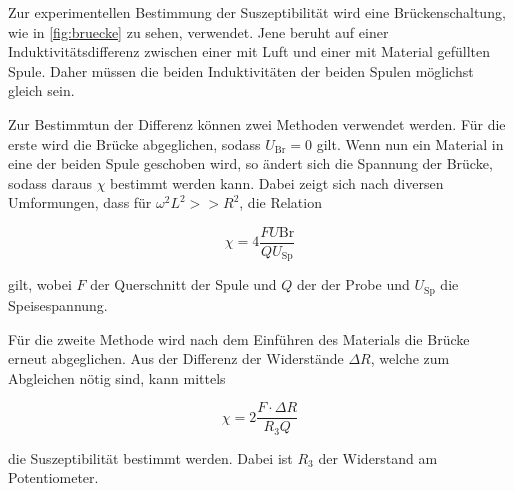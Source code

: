Zur experimentellen Bestimmung der Suszeptibilität wird eine Brückenschaltung, wie in \autoref{fig:bruecke} zu sehen, verwendet.
Jene beruht auf einer Induktivitätsdifferenz zwischen einer mit Luft und einer mit Material gefüllten Spule.
Daher müssen die beiden Induktivitäten der beiden Spulen möglichst gleich sein.

Zur Bestimmtun der Differenz können zwei Methoden verwendet werden.
Für die erste wird die Brücke abgeglichen, sodass $U_\text{Br} = 0$ gilt.
Wenn nun ein Material in eine der beiden Spule geschoben wird, so ändert sich die Spannung der Brücke, sodass daraus $\chi$ bestimmt werden kann.
Dabei zeigt sich nach diversen Umformungen, dass für $\omega^2 L^2 >> R^2$, die Relation

\begin{equation}
    \label{eqn:suszep-spannung}
    \chi = 4 \frac{F U\text{Br}}{Q U_\text{Sp}}
\end{equation}

gilt, wobei $F$ der Querschnitt der Spule und $Q$ der der Probe und $U_\text{Sp}$ die Speisespannung.

Für die zweite Methode wird nach dem Einführen des Materials die Brücke erneut abgeglichen.
Aus der Differenz der Widerstände $\Delta R$, welche zum Abgleichen nötig sind, kann mittels

\begin{equation}
    \label{eqn:suszep-wider}
    \chi = 2 \frac{F \cdot \Delta R}{R_3 Q}
\end{equation}

die Suszeptibilität bestimmt werden. Dabei ist $R_3$ der Widerstand am Potentiometer.